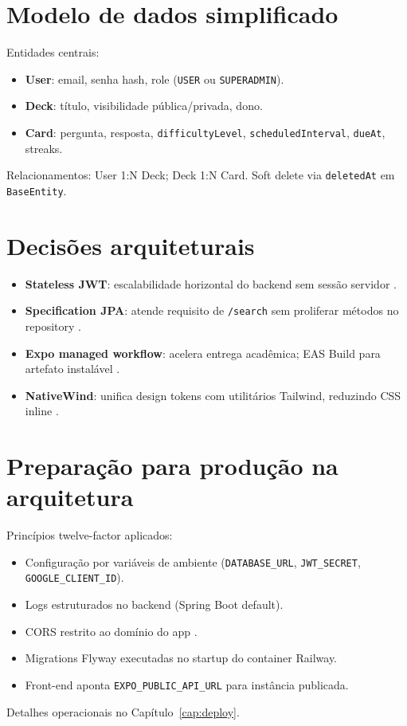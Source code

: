 \section{Modelo de dados simplificado}

Entidades centrais:
\begin{itemize}
    \item \textbf{User}: email, senha hash, role (\texttt{USER} ou \texttt{SUPERADMIN}).
    \item \textbf{Deck}: título, visibilidade pública/privada, dono.
    \item \textbf{Card}: pergunta, resposta, \texttt{difficultyLevel}, \texttt{scheduledInterval}, \texttt{dueAt}, streaks.
\end{itemize}

Relacionamentos: User 1:N Deck; Deck 1:N Card. Soft delete via \texttt{deletedAt} em \texttt{BaseEntity}.

\section{Decisões arquiteturais}

\begin{itemize}
    \item \textbf{Stateless JWT}: escalabilidade horizontal do backend sem sessão servidor \cite{spring_security_jwt}.
    \item \textbf{Specification JPA}: atende requisito de \texttt{/search} sem proliferar métodos no repository \cite{jpa_specification}.
    \item \textbf{Expo managed workflow}: acelera entrega acadêmica; EAS Build para artefato instalável \cite{expo_eas_build}.
    \item \textbf{NativeWind}: unifica design tokens com utilitários Tailwind, reduzindo CSS inline \cite{nativewind_docs,tailwind_docs}.
\end{itemize}

\section{Preparação para produção na arquitetura}

Princípios twelve-factor \cite{twelve_factor} aplicados:
\begin{itemize}
    \item Configuração por variáveis de ambiente (\texttt{DATABASE\_URL}, \texttt{JWT\_SECRET}, \texttt{GOOGLE\_CLIENT\_ID}).
    \item Logs estruturados no backend (Spring Boot default).
    \item CORS restrito ao domínio do app \cite{helmet_cors_spring}.
    \item Migrations Flyway executadas no startup do container Railway.
    \item Front-end aponta \texttt{EXPO\_PUBLIC\_API\_URL} para instância publicada.
\end{itemize}

Detalhes operacionais no Capítulo~\ref{cap:deploy}.
